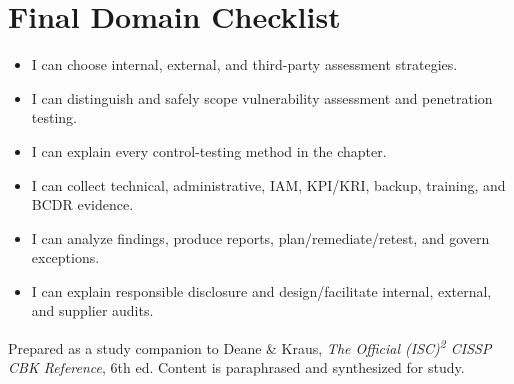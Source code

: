 \documentclass[10pt,letterpaper]{article}
\begin{document}
\section{\color{navy}Final Domain Checklist}
\begin{itemize}[label=\(\square\)]
\item I can choose internal, external, and third-party assessment strategies.
\item I can distinguish and safely scope vulnerability assessment and penetration testing.
\item I can explain every control-testing method in the chapter.
\item I can collect technical, administrative, IAM, KPI/KRI, backup, training, and BCDR evidence.
\item I can analyze findings, produce reports, plan/remediate/retest, and govern exceptions.
\item I can explain responsible disclosure and design/facilitate internal, external, and supplier audits.
\end{itemize}
\vfill{\footnotesize\color{teal}Prepared as a study companion to Deane \& Kraus, \textit{The Official (ISC)\textsuperscript{2} CISSP CBK Reference}, 6th ed. Content is paraphrased and synthesized for study.}
\end{document}
